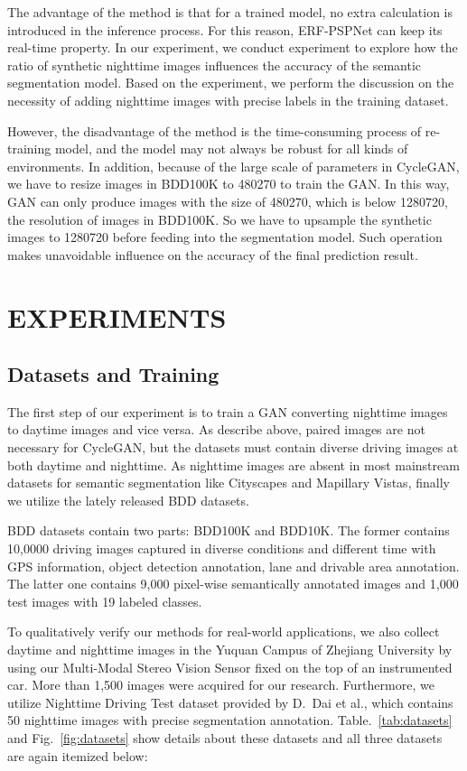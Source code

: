 \documentclass[a4paper]{spie}
\begin{document}
The advantage of the method is that for a trained model, no extra calculation is introduced in the inference process. For this reason, ERF-PSPNet can keep its real-time property. In our experiment, we conduct experiment to explore how the ratio of synthetic nighttime images influences the accuracy of the semantic segmentation model. Based on the experiment, we perform the discussion on the necessity of adding nighttime images with precise labels in the training dataset.


However, the disadvantage of the method is the time-consuming process of re-training model, and the model may not always be robust for all kinds of environments. In addition, because of the large scale of parameters in CycleGAN, we have to resize images in BDD100K to 480270 to train the GAN. In this way, GAN can only produce images with the size of 480270, which is below 1280720, the resolution of images in BDD100K. So we have to upsample the synthetic images to 1280720 before feeding into the segmentation model. Such operation makes unavoidable influence on the accuracy of the final prediction result.

\section{EXPERIMENTS}

\subsection{Datasets and Training}

The first step of our experiment is to train a GAN converting nighttime images to daytime images and vice versa. As describe above, paired images are not necessary for CycleGAN\cite{zhu2017unpaired}, but the datasets must contain diverse driving images at both daytime and nighttime. As nighttime images are absent in most mainstream datasets for semantic segmentation like Cityscapes\cite{cordts2016cityscapes} and Mapillary Vistas\cite{neuhold2017mapillary}, finally we utilize the lately released BDD datasets\cite{yu2018bdd100k}. 

BDD datasets contain two parts: BDD100K and BDD10K. The former contains 10,0000 driving images captured in diverse conditions and different time with GPS information, object detection annotation, lane and drivable area annotation. The latter one contains 9,000 pixel-wise semantically annotated images and 1,000 test images with 19 labeled classes.

To qualitatively verify our methods for real-world applications, we also collect daytime and nighttime images in the Yuquan Campus of Zhejiang University by using our Multi-Modal Stereo Vision Sensor\cite{sun2019multi} fixed on the top of an instrumented car. More than 1,500 images were acquired for our research. Furthermore, we utilize Nighttime Driving Test dataset provided by D.~Dai et al.\cite{dai2018dark}, which contains 50 nighttime images with precise segmentation annotation. Table.~\ref{tab:datasets} and Fig.~\ref{fig:datasets} show details about these datasets and all three datasets are again itemized below:
\end{document}
